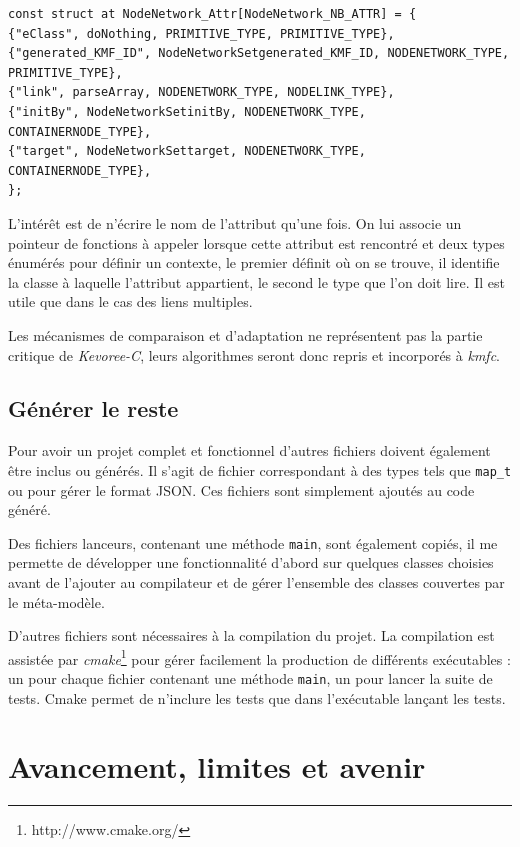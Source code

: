 \begin{lstlisting}[frame=single, label={deserial}]
const struct at NodeNetwork_Attr[NodeNetwork_NB_ATTR] = {
{"eClass", doNothing, PRIMITIVE_TYPE, PRIMITIVE_TYPE},
{"generated_KMF_ID", NodeNetworkSetgenerated_KMF_ID, NODENETWORK_TYPE, PRIMITIVE_TYPE},
{"link", parseArray, NODENETWORK_TYPE, NODELINK_TYPE},
{"initBy", NodeNetworkSetinitBy, NODENETWORK_TYPE, CONTAINERNODE_TYPE},
{"target", NodeNetworkSettarget, NODENETWORK_TYPE, CONTAINERNODE_TYPE},
};
\end{lstlisting}

L'intérêt est de n'écrire le nom de l'attribut qu'une fois. On lui associe un pointeur de fonctions à appeler lorsque cette attribut est rencontré et deux types énumérés pour définir un contexte, le premier définit où on se trouve, il identifie la classe à laquelle l'attribut appartient, le second le type que l'on doit lire. Il est utile que dans le cas des liens multiples.

Les mécanismes de comparaison et d'adaptation ne représentent pas la partie critique de \emph{Kevoree-C}, leurs algorithmes seront donc repris et incorporés à \emph{kmfc}.

\subsection{Générer le reste}

Pour avoir un projet complet et fonctionnel d'autres fichiers doivent également être inclus ou générés. Il s'agit de fichier correspondant à des types tels que \texttt{map\_t} ou pour gérer le format JSON. Ces fichiers sont simplement ajoutés au code généré.

Des fichiers lanceurs, contenant une méthode \texttt{main}, sont également copiés, il me permette de développer une fonctionnalité d'abord sur quelques classes choisies avant de l'ajouter au compilateur et de gérer l'ensemble des classes couvertes par le méta-modèle.

D'autres fichiers sont nécessaires à la compilation du projet. La compilation est assistée par \emph{cmake}\footnote{http://www.cmake.org/} pour gérer facilement la production de différents exécutables : un pour chaque fichier contenant une méthode \texttt{main}, un pour lancer la suite de tests. Cmake permet de n'inclure les tests que dans l'exécutable lançant les tests.

\section{Avancement, limites et avenir}

